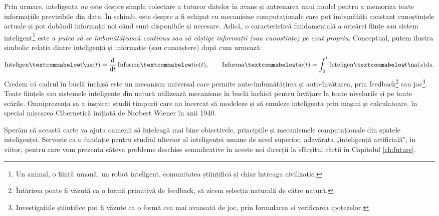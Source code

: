 \documentclass[../../book-main_ro.tex]{subfiles}
\begin{document}
Prin urmare, inteligența {\em nu} este despre simpla colectare a tuturor datelor în avans și antrenarea unui model pentru a memoriza toate informațiile previzibile din date. În schimb, este despre a fi echipat cu mecanisme computaționale care pot îmbunătăți constant cunoștințele actuale și pot dobândi informații noi când sunt disponibile și necesare. Adică, o caracteristică fundamentală a oricărei ființe sau sistem inteligent\footnote{Un animal, o ființă umană, un robot inteligent, comunitatea științifică și chiar întreaga civilizație.} este {\em a putea să se îmbunătățească continuu sau să câștige informații (sau cunoștințe) pe cont propriu}. Conceptual, putem ilustra simbolic relația dintre inteligență și informație (sau cunoaștere) după cum urmează:
\begin{equation}
\operatorname{Inteligență}(t) = \odv*{\operatorname{Informație}}{t}(t), \qquad
\operatorname{Informație}(t)  = \int_0^t \operatorname{Inteligență}(s) \odif{s}.
\end{equation}
Credem că cadrul în buclă închisă este un mecanism universal care permite auto-îmbunătățirea și auto-învățarea, prin feedback\footnote{Întărirea poate fi văzută ca o formă primitivă de feedback, să zicem selecția naturală de către natură.} sau joc\footnote{Investigațiile științifice pot fi văzute ca o formă cea mai avansată de joc, prin formularea și verificarea ipotezelor.}. Toate ființele sau sistemele inteligente din natură utilizează mecanisme în buclă închisă pentru învățare la toate nivelurile și pe toate scările. Omniprezența sa a inspirat studii timpurii care au încercat să modeleze și să emuleze inteligența prin mașini și calculatoare, în special mișcarea Cibernetică inițiată de Norbert Wiener în anii 1940.

Sperăm că această carte va ajuta oamenii să înțeleagă mai bine obiectivele, principiile și mecanismele computaționale din spatele inteligenței. Servește ca o fundație pentru studiul ulterior al inteligenței umane de nivel superior, adevărata „inteligență artificială", în viitor, pentru care vom prezenta câteva probleme deschise semnificative în aceste noi direcții la sfârșitul cărții în Capitolul \ref{ch:future}.
\end{document}
